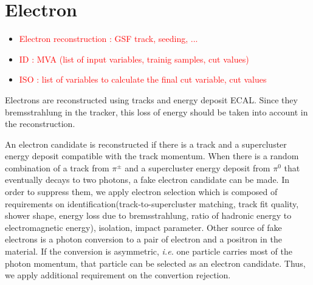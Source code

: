 \section{ Electron }
\begin{itemize}
\item \textcolor{red}{Electron reconstruction : GSF track, seeding, ... }
\item \textcolor{red}{ID  : MVA (list of input variables, trainig samples, cut values)}
\item \textcolor{red}{ISO : list of variables to calculate the final cut variable, cut values  }
\end{itemize}

Electrons are reconstructed using tracks and energy deposit ECAL. 
Since they bremsstrahlung in the tracker, this loss of energy should be taken 
into account in the reconstruction. 

An electron candidate is reconstructed if there is a track and a supercluster energy deposit
compatible with the track momentum. When there is a random combination of 
a track from $\pi^\pm$ and a supercluster energy deposit from $\pi^0$ that eventually 
decays to two photons, a fake electron candidate can be made. 
In order to suppress them, we apply electron selection which is composed of 
requirements on identification(track-to-supercluster matching, 
track fit quality, shower shape, energy loss due to bremsstrahlung, ratio of hadronic energy
to electromagnetic energy), isolation, impact parameter.  
Other source of fake electrons is a photon conversion to a pair of electron and a positron 
in the material. If the conversion is asymmetric, \textit{i.e.} one particle carries 
most of the photon momentum, that particle can be selected as an electron 
candidate. Thus, we apply additional requirement on the convertion rejection.

